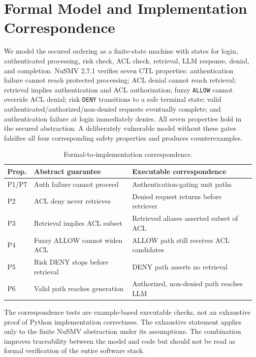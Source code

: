 \section{Formal Model and Implementation Correspondence}
We model the secured ordering as a finite-state machine with states for login, authenticated processing, risk check, ACL check, retrieval, LLM response, denial, and completion. NuSMV 2.7.1 verifies seven CTL properties: authentication failure cannot reach protected processing; ACL denial cannot reach retrieval; retrieval implies authentication and ACL authorization; fuzzy \texttt{ALLOW} cannot override ACL denial; risk \texttt{DENY} transitions to a safe terminal state; valid authenticated/authorized/non-denied requests eventually complete; and authentication failure at login immediately denies. All seven properties hold in the secured abstraction. A deliberately vulnerable model without these gates falsifies all four corresponding safety properties and produces counterexamples.

\begin{table}[t]
\caption{Formal-to-implementation correspondence.}
\label{tab:formal}
\centering
\scriptsize
\begin{tabular}{p{}p{}p{}}
\toprule
Prop. & Abstract guarantee & Executable correspondence \\
\midrule
P1/P7 & Auth failure cannot proceed & Authentication-gating unit paths \\
P2 & ACL deny never retrieves & Denied request returns before retriever \\
P3 & Retrieval implies ACL subset & Retrieved aliases asserted subset of ACL \\
P4 & Fuzzy ALLOW cannot widen ACL & ALLOW path still receives ACL candidates \\
P5 & Risk DENY stops before retrieval & DENY path asserts no retrieval \\
P6 & Valid path reaches generation & Authorized, non-denied path reaches LLM \\
\bottomrule
\end{tabular}
\end{table}

The correspondence tests are example-based executable checks, not an exhaustive proof of Python implementation correctness. The exhaustive statement applies only to the finite NuSMV abstraction under its assumptions. The combination improves traceability between the model and code but should not be read as formal verification of the entire software stack.
